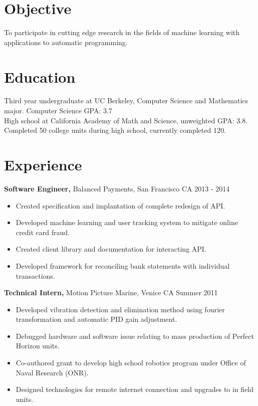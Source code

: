 \documentclass[margin]{res}
\begin{document}
\begin{resume}

\section{Objective}
To participate in cutting edge research in the fields of machine learning with applications to automatic programming.

\section{Education}
Third year undergraduate at UC Berkeley, Computer Science and Mathematics major.  Computer Science GPA: 3.7 \\
High school at California Academy of Math and Science, unweighted GPA: 3.8. \\
Completed 50 college units during high school, currently completed 120.


\section{Experience}
{\bf Software Engineer,} Balanced Payments, San Francisco CA \hfill 2013 - 2014
\begin{itemize} \itemsep -2pt
  \item Created specification and implantation of complete redesign of API.
  \item Developed machine learning and user tracking system to mitigate online credit card fraud.
  \item Created client library and documentation for interacting API.
  \item Developed framework for reconciling bank statements with individual transactions.
\end{itemize}

{\bf Technical Intern,} Motion Picture Marine, Venice CA \hfill Summer 2011
\begin{itemize} \itemsep -2pt  %
  \item Developed vibration detection and elimination method using fourier transformation and automatic PID gain adjustment.
  \item Debugged hardware and software issue relating to mass production of Perfect Horizon units.
  \item Co-authored grant to develop high school robotics program under Office of Naval Research (ONR).
  \item Designed technologies for remote internet connection and upgrades to in field units.
\end{itemize}



\end{resume}
\end{document}

